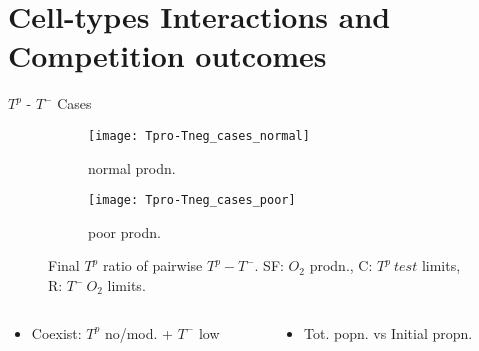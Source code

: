 \section{Cell-types Interactions and Competition outcomes}

\begin{frame}{$T^p$ - $T^-$ Cases}
  \begin{figure}[h]
    \centering
    \begin{subfigure}[b]{0.48\textwidth}
      \centering
      \texttt{[image: Tpro-Tneg\_cases\_normal]}
      \caption{normal prodn.}
    \end{subfigure}
    \begin{subfigure}[b]{0.48\textwidth}
      \centering
      \texttt{[image: Tpro-Tneg\_cases\_poor]}
      \caption{poor prodn.}
    \end{subfigure}
    \caption{Final $T^p$ ratio of pairwise $T^p - T^-$. SF: $O_2$ prodn., C: $T^p\ test$ limits, R: $T^-\ O_2$ limits.}
  \end{figure}
  \begin{columns}
    \begin{column}{0.5\textwidth}
      \begin{itemize}
        \item Coexist: $T^p$ no/mod. + $T^-$ low
      \end{itemize}
    \end{column}
    \begin{column}{0.5\textwidth}
      \begin{itemize}
        \item Tot. popn. vs Initial propn.
      \end{itemize}
    \end{column}
  \end{columns}
\end{frame}


